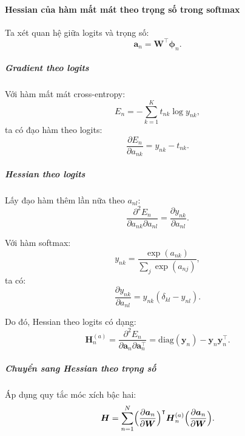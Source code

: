 \paragraph{Hessian của hàm mất mát theo trọng số trong softmax}

Ta xét quan hệ giữa logits và trọng số: \begin{equation}
  \boldsymbol{a}_n = \boldsymbol{W}^\intercal \boldsymbol{\phi}_n.
\end{equation}

\subparagraph{Gradient theo logits}

Với hàm mất mát cross-entropy: \begin{equation}
  E_n = - \sum_{k=1}^{K} t_{nk} \log y_{nk},
\end{equation} ta có đạo hàm theo logits: \begin{equation}
  \frac{\partial E_n}{\partial a_{nk}} = y_{nk} - t_{nk}.
\end{equation}

\subparagraph{Hessian theo logits}

Lấy đạo hàm thêm lần nữa theo $a_{nl}$: \begin{equation}
  \frac{\partial^2 E_n}{\partial a_{nk} \partial a_{nl}} = \frac{\partial
  y_{nk}}{\partial a_{nl}}.
\end{equation}

Với hàm softmax: \begin{equation}
  y_{nk} = \frac{\exp(a_{nk})}{\sum_{j} \exp(a_{nj})},
\end{equation} ta có: \begin{equation}
  \frac{\partial y_{nk}}{\partial a_{nl}} = y_{nk}(\delta_{kl} - y_{nl}).
\end{equation}

Do đó, Hessian theo logits có dạng: \begin{equation}
  \boldsymbol{H}_n^{(a)} = \frac{\partial^2 E_n}{\partial \boldsymbol{a}_n
  \partial \boldsymbol{a}_n^\intercal} = \mathrm{diag}(\boldsymbol{y}_n) -
  \boldsymbol{y}_n \boldsymbol{y}_n^\intercal.
\end{equation}

\subparagraph{Chuyển sang Hessian theo trọng số}

Áp dụng quy tắc móc xích bậc hai: \begin{equation}
  \boldsymbol{H} = \sum_{n=1}^{N} \Bigl( \frac{\partial
  \boldsymbol{a}_n}{\partial \boldsymbol{W}} \Bigr)^\intercal
  \boldsymbol{H}_n^{(a)} \Bigl( \frac{\partial \boldsymbol{a}_n}{\partial
  \boldsymbol{W}} \Bigr).
\end{equation}

